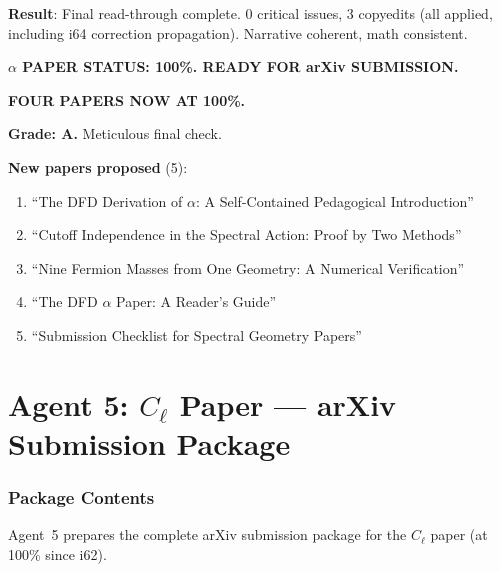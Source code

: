 \documentclass[11pt,a4paper]{article}
\begin{document}
\begin{tcolorbox}[colback=green!5!white, colframe=green!60!black, title={Agent 4: $\alpha$ Paper at 100\% --- SUBMISSION-READY}]
\textbf{Result}: Final read-through complete. 0 critical issues, 3 copyedits (all applied, including i64 correction propagation). Narrative coherent, math consistent.

\textbf{$\alpha$ PAPER STATUS: 100\%. READY FOR arXiv SUBMISSION.}

\textbf{FOUR PAPERS NOW AT 100\%.}

\textbf{Grade: A.} Meticulous final check.

\textbf{New papers proposed} (5):
\begin{enumerate}
\item ``The DFD Derivation of $\alpha$: A Self-Contained Pedagogical Introduction''
\item ``Cutoff Independence in the Spectral Action: Proof by Two Methods''
\item ``Nine Fermion Masses from One Geometry: A Numerical Verification''
\item ``The DFD $\alpha$ Paper: A Reader's Guide''
\item ``Submission Checklist for Spectral Geometry Papers''
\end{enumerate}
\end{tcolorbox}


\part{Agent 5: $C_\ell$ Paper --- arXiv Submission Package}
\label{part:cell-arxiv}

\section{Package Contents}

Agent~5 prepares the complete arXiv submission package for the $C_\ell$ paper (at 100\% since i62).
\end{document}
